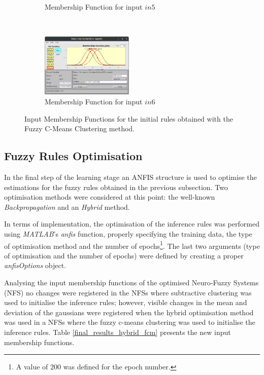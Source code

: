\documentclass[11pt]{article}
\begin{document}
\begin{figure}[ht]
\begin{subfigure}[t]{0.3\textwidth}
		\caption{Membership Function for input $in5$}
	\end{subfigure}
	~
	\begin{subfigure}[t]{0.3\textwidth}
		\centering
		\includegraphics[height=1.2in]{images/fcm_in6}
		\caption{Membership Function for input $in6$}
	\end{subfigure}
	\caption{Input Membership Functions for the initial rules obtained with the Fuzzy C-Means Clustering method.}
\end{figure}

\subsection{Fuzzy Rules Optimisation}

In the final step of the learning stage an ANFIS structure is used to optimise the estimations for the fuzzy rules obtained in the previous subsection. Two optimisation methods were considered at this point: the well-known \emph{Backpropagation} and an \emph{Hybrid} method.

In terms of implementation, the optimisation of the inference rules was performed using \emph{MATLAB}'s \emph{anfis} function, properly specifying the training data, the type of optimisation method and the number of epochs\footnote{A value of $200$ was defined for the epoch number.}. The last two arguments (type of optimisation and the number of epochs) were defined by creating a proper \emph{anfisOptions} object.

Analysing the input membership functions of the optimised Neuro-Fuzzy Systems (NFS) no changes were registered in the NFSs where subtractive clustering was used to initialise the inference rules; however, visible changes in the mean and deviation of the gaussians were registered when the hybrid optimisation method was used in a NFSs where the fuzzy c-means clustering was used to initialise the inference rules. Table \ref{final_results_hybrid_fcm} presents the new input membership functions.

\pagebreak
\end{document}
